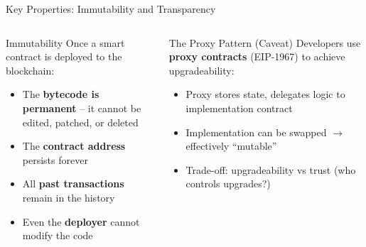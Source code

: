 \documentclass[8pt,aspectratio=169]{beamer}
\begin{document}
\begin{frame}{Key Properties: Immutability and Transparency}
\begin{columns}[T]
\begin{block}{\textcolor{mlblue}{Immutability}}
\footnotesize
Once a smart contract is deployed to the blockchain:
\begin{itemize}
  \item The \textbf{bytecode is permanent} -- it cannot be edited, patched, or deleted
  \item The \textbf{contract address} persists forever
  \item All \textbf{past transactions} remain in the history
  \item Even the \textbf{deployer} cannot modify the code
\end{itemize}
\end{block}
\vspace{2mm}
\begin{alertblock}{The Proxy Pattern (Caveat)}
\footnotesize
Developers use \textbf{proxy contracts} (EIP-1967) to achieve upgradeability:
\begin{itemize}
  \item Proxy stores state, delegates logic to implementation contract
  \item Implementation can be swapped $\rightarrow$ effectively ``mutable''
  \item Trade-off: upgradeability vs trust (who controls upgrades?)
\end{itemize}
\end{alertblock}


\end{columns}
\end{frame}
\end{document}
